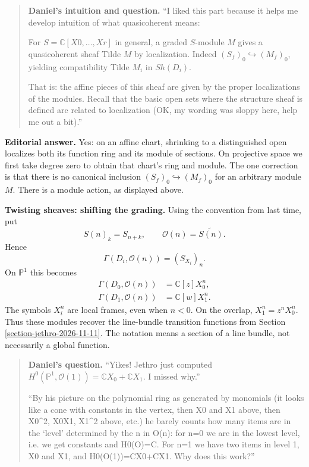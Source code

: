 \begin{quote}
\textbf{Daniel's intuition and question.}
``I liked this part because it helps me
 develop intuition of what quasicoherent
 means:

For $S=\mathbb{C}[X0,\ldots,Xr]$ in general,
 a graded $S$-module $M$ gives a
 quasicoherent sheaf Tilde $M$ by
 localization. Indeed
 $(S_f)_0\hookrightarrow(M_f)_0$, yielding
 compatibility Tilde $M_i$ in $Sh(D_i)$.

That is: the affine pieces of this sheaf
 are given by the proper localizations of
 the modules. Recall that the basic open
 sets where the structure sheaf is defined
 are related to localization (OK, my wording
 was sloppy here, help me out a bit).''
\end{quote}

\noindent
\textbf{Editorial answer.} Yes: on an
affine chart, shrinking to a distinguished
open localizes both its function ring and
its module of sections. On projective
space we first take degree zero to obtain
that chart's ring and module. The one
correction is that there is no canonical
inclusion $(S_f)_0\hookrightarrow(M_f)_0$
for an arbitrary module $M$. There is a
module action, as displayed above.

\medskip\noindent
{\bf Twisting sheaves: shifting the grading.}
Using the convention from last time, put
$$
S(n)_k=S_{n+k},\qquad
\mathcal{O}(n)=\widetilde{S(n)}.
$$
Hence
$$
\Gamma(D_i,\mathcal{O}(n))=(S_{X_i})_n.
$$
On $\mathbb{P}^1$ this becomes
$$
\begin{aligned}
\Gamma(D_0,\mathcal{O}(n))
&=\mathbb{C}[z]X_0^n,\\
\Gamma(D_1,\mathcal{O}(n))
&=\mathbb{C}[w]X_1^n.
\end{aligned}
$$
The symbols $X_i^n$ are local frames, even
when $n<0$. On the overlap,
$X_1^n=z^nX_0^n$. Thus these modules recover
the line-bundle transition functions from
Section \ref{section-jethro-2026-11-11}.
The notation means a section of a line
bundle, not necessarily a global function.

\begin{quote}
\textbf{Daniel's question.}
``Yikes! Jethro just computed
 $H^0(\mathbb{P}^1,\mathcal{O}(1))
 =\mathbb{C}X_0+\mathbb{C}X_1$.
 I missed why.''

``By his picture on the polynomial ring as
 generated by monomials (it looks like a
 cone with constants in the vertex, then
 X0 and X1 above, then X0\^{}2, X0X1,
 X1\^{}2 above, etc.) he barely counts how
 many items are in the `level' determined
 by the n in O(n): for n=0 we are in the
 lowest level, i.e. we get constants and
 H0(O)=C. For n=1 we have two items in level
 1, X0 and X1, and H0(O(1))=CX0+CX1.
 Why does this work?''
\end{quote}

